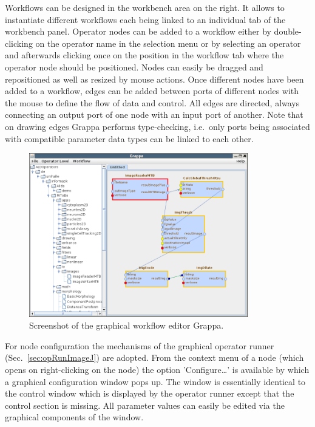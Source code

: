 Workflows can be designed in the workbench area on the right. It allows to instantiate different 
workflows each being linked to an individual tab of the workbench panel. Operator nodes can be
added to a workflow either by double-clicking on the operator name in the selection menu or by 
selecting an operator and afterwards clicking once on the position in the workflow tab where the 
operator node should be positioned. Nodes can easily be dragged and repositioned as well as 
resized by mouse actions. Once different nodes have been added to a workflow, edges
can be added between ports of different nodes with the mouse to define the flow of data and control. 
All edges
are directed, always connecting an output port of one node with an input port of another. Note
that on drawing edges Grappa performs type-checking, i.e.~only ports being associated with 
compatible parameter data types can be linked to each other.
\begin{center}
\begin{figure}[t]
\begin{center}
\includegraphics[width=0.85\textwidth]{../images/ScreenshotGrappa.png}
\caption{\label{fig:grappa}Screenshot of the graphical workflow editor Grappa.}
\end{center}
\end{figure}
\end{center}

\vspace*{-0.5cm}
For node configuration the mechanisms of the graphical operator runner (Sec.~\ref{sec:opRunImageJ})
are adopted. From the context menu of a node (which opens on right-clicking on the node) 
the option 'Configure\ldots' is available by which a graphical configuration window pops up.
The window is essentially identical to the control window which is displayed by the operator 
runner except that the control section is missing. All parameter values can easily be edited via
the graphical components of the window.

